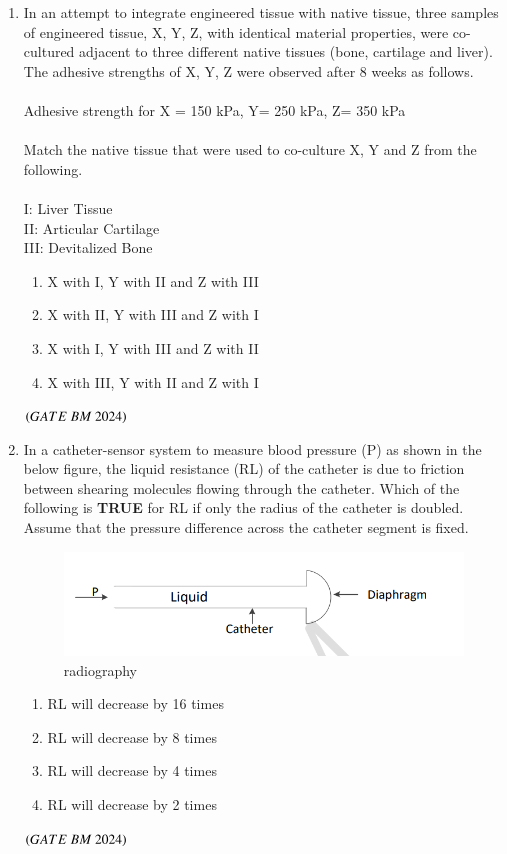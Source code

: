 \documentclass[journal,12pt,onecolumn]{IEEEtran}
\theoremstyle{remark}
\begin{document}
\begin{enumerate}
\item In an attempt to integrate engineered tissue with native tissue, three samples of
engineered tissue, X, Y, Z, with identical material properties, were co-cultured
adjacent to three different native tissues (bone, cartilage and liver). The adhesive
strengths of X, Y, Z were observed after 8 weeks as follows.\\
\\Adhesive strength for X = 150 kPa, Y= 250 kPa, Z= 350 kPa\\
\\Match the native tissue that were used to co-culture X, Y and Z from the following.\\
\\I: Liver Tissue\\
II: Articular Cartilage\\
III: Devitalized Bone\\
\begin{enumerate}[label=(\Alph*)]
    \item X with I, Y with II and Z with III
    \item X with II, Y with III and Z with I
    \item X with I, Y with III and Z with II
    \item X with III, Y with II and Z with I
\end{enumerate}
\hfill $\brak{GATE\ BM\ 2024}$

\item In a catheter-sensor system to measure blood pressure (P) as shown in the below figure, the liquid resistance (RL) of the catheter is due to friction between shearing molecules flowing through the catheter. Which of the following is \textbf{TRUE} for RL if only the radius of the catheter is doubled. Assume that the pressure difference across the catheter segment is fixed.
\begin{figure}[H]
\centering
\includegraphics[width=0.4\columnwidth]{Figs/Fig 9.png}
\caption{radiography}
\label{fig:placeholder}
\end{figure}
\begin{enumerate}[label=(\Alph*)]
    \item RL will decrease by 16 times
    \item RL will decrease by 8 times
    \item RL will decrease by 4 times
    \item RL will decrease by 2 times
    \end{enumerate}
\hfill $\brak{GATE\ BM\ 2024}$


\end{enumerate}
\end{document}
